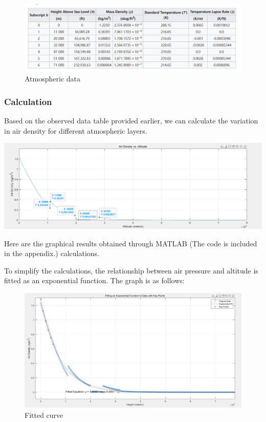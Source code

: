 \documentclass[12pt]{article}
\begin{document}
\begin{figure}[!hbtp]
    \centering 
    \includegraphics[width = 0.8\linewidth]{image/008.png}
    \caption{Atmospheric data\cite{usatmosphere1976}}
\end{figure}

\subsubsection{Calculation}

\begin{minipage}{0.3\linewidth}
    Based on the observed data table provided earlier, we can calculate the variation in air density 
    for different atmospheric layers. 
\end{minipage}
\hfill
\begin{minipage}{0.7\linewidth}
    \centering 
    \includegraphics[width = 0.8\linewidth]{image/009.png}
\end{minipage}

\vspace{12pt}
Here are the graphical results obtained through MATLAB (The code is included in the appendix.) calculations.

To simplify the calculations, the relationship between air pressure and 
altitude is fitted as an exponential function. The graph is as follows:

\begin{figure}[!hbtp]
    \centering 
    \includegraphics[width = 0.8\linewidth]{image/010.png}
    \caption{Fitted curve}
\end{figure}
\end{document}
